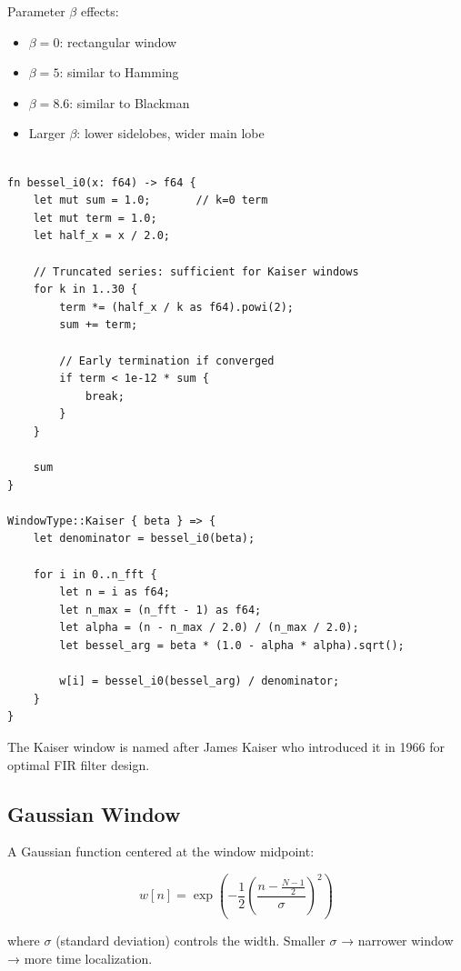 Parameter $\beta$ effects:
\begin{itemize}
  \item $\beta = 0$: rectangular window
  \item $\beta = 5$: similar to Hamming
  \item $\beta = 8.6$: similar to Blackman
  \item Larger $\beta$: lower sidelobes, wider main lobe
\end{itemize}

\begin{lstlisting}[caption={Kaiser window with modified Bessel function}]

fn bessel_i0(x: f64) -> f64 {
    let mut sum = 1.0;       // k=0 term
    let mut term = 1.0;
    let half_x = x / 2.0;

    // Truncated series: sufficient for Kaiser windows
    for k in 1..30 {
        term *= (half_x / k as f64).powi(2);
        sum += term;

        // Early termination if converged
        if term < 1e-12 * sum {
            break;
        }
    }

    sum
}

WindowType::Kaiser { beta } => {
    let denominator = bessel_i0(beta);

    for i in 0..n_fft {
        let n = i as f64;
        let n_max = (n_fft - 1) as f64;
        let alpha = (n - n_max / 2.0) / (n_max / 2.0);
        let bessel_arg = beta * (1.0 - alpha * alpha).sqrt();

        w[i] = bessel_i0(bessel_arg) / denominator;
    }
}
\end{lstlisting}

The Kaiser window is named after James Kaiser who introduced it in
1966 for optimal FIR filter design.

\subsection{Gaussian Window}\label{subsec:gaussian_window}

A Gaussian function centered at the window midpoint:

\begin{equation}
  w[n] = \exp\left(-\frac{1}{2}\left(\frac{n -
  \frac{N-1}{2}}{\sigma}\right)^{2}\right)
\end{equation}

where $\sigma$ (standard deviation) controls the width. Smaller
$\sigma$ → narrower window → more time localization.

